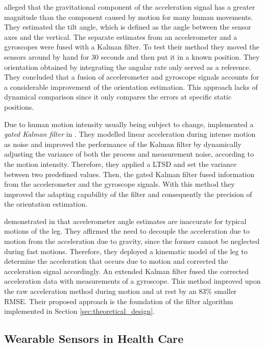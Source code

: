 \citeauthor{Luinge_orientation_acc_gyro_99} \cite{Luinge_orientation_acc_gyro_99} alleged that the gravitational component of the acceleration signal has a greater magnitude than the component caused by motion for many human movements. They estimated the tilt angle, which is defined as the angle between the sensor axes and the vertical. The separate estimates from an accelerometer and a gyroscopes were fused with a Kalman filter. To test their method they moved the sensors around by hand for 30 seconds and then put it in a known position. They orientation obtained by integrating the angular rate only served as a reference. They concluded that a fusion of accelerometer and gyroscope signals accounts for a considerable improvement of the orientation estimation. This approach lacks of dynamical comparison since it only compares the errors at specific static positions.

Due to human motion intensity usually being subject to change, \citeauthor{olivares_vicente_signal_2013} implemented a \emph{gated Kalman filter} in \cite{olivares_vicente_signal_2013}. They modelled linear acceleration during intense motion as noise and improved the performance of the Kalman filter by dynamically adjusting the variance of both the process and measurement noise, according to the motion intensity. Therefore, they applied a \gls{LTSD} and set the variance between two predefined values. Then, the gated Kalman filter fused information from the accelerometer and the gyroscope signals. With this method they improved the adapting capability of the filter and consequently the precision of the orientation estimation.

\citeauthor{bennett_motion_2014} demonstrated in \cite{bennett_motion_2014} that accelerometer angle estimates are inaccurate for typical motions of the leg. They affirmed the need to decouple the acceleration due to motion from the acceleration due to gravity, since the former cannot be neglected during fast motions. Therefore, they deployed a kinematic model of the leg to determine the acceleration that occurs due to motion and corrected the acceleration signal accordingly. An extended Kalman filter fused the corrected acceleration data with measurements of a gyroscope. This method improved upon the raw acceleration method during motion and at rest by an 83\% smaller \gls{RMSE}. Their proposed approach is the foundation of the filter algorithm implemented in Section \ref{sec:theoretical_design}.

\subsection{Wearable Sensors in Health Care}\label{sec:MARG_sensors_medical}

